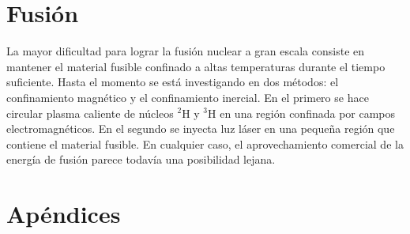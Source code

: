 \section{Fusión}

La mayor dificultad para lograr la fusión nuclear a gran escala consiste en mantener el material fusible confinado a altas temperaturas durante el tiempo suficiente. Hasta el momento se está investigando en dos métodos: el confinamiento magnético y el confinamiento inercial. En el primero se hace circular plasma caliente de núcleos $^2$H y $^3$H en una región confinada por campos electromagnéticos. En el segundo se inyecta luz láser en una pequeña región que contiene el material fusible. En cualquier caso, el aprovechamiento comercial de la energía de fusión parece todavía una posibilidad lejana.

\section{Apéndices}